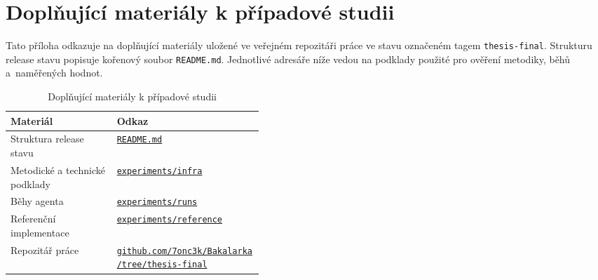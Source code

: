 \chapter{Doplňující materiály k případové studii}
\label{app:doplnujici-materialy}

Tato příloha odkazuje na doplňující materiály uložené ve veřejném repozitáři
práce ve stavu označeném tagem \texttt{thesis-final}. Strukturu release stavu
popisuje kořenový soubor \texttt{README.md}. Jednotlivé adresáře níže vedou na
podklady použité pro ověření metodiky, běhů a~naměřených hodnot.

\begin{table}[htbp]
\centering
\caption{Doplňující materiály k případové studii}
\label{tab:doplnujici-materialy}
\footnotesize
\setlength{\tabcolsep}{4pt}
\begin{tabularx}{\linewidth}{@{}p{0.42\linewidth}X@{}}
\toprule
\textbf{Materiál} & \textbf{Odkaz} \\
\midrule
Struktura release stavu &
\href{https://github.com/7onc3k/Bakalarka/blob/thesis-final/README.md}{\texttt{README.md}} \\
\addlinespace
Metodické a technické podklady &
\href{https://github.com/7onc3k/Bakalarka/tree/thesis-final/experiments/infra}{\texttt{experiments/infra}} \\
\addlinespace
Běhy agenta &
\href{https://github.com/7onc3k/Bakalarka/tree/thesis-final/experiments/runs}{\texttt{experiments/runs}} \\
\addlinespace
Referenční implementace &
\href{https://github.com/7onc3k/Bakalarka/tree/thesis-final/experiments/reference}{\texttt{experiments/reference}} \\
\addlinespace
Repozitář práce &
\href{https://github.com/7onc3k/Bakalarka/tree/thesis-final}{\texttt{github.com/7onc3k/Bakalarka/tree/thesis-final}} \\
\bottomrule
\end{tabularx}
\end{table}
